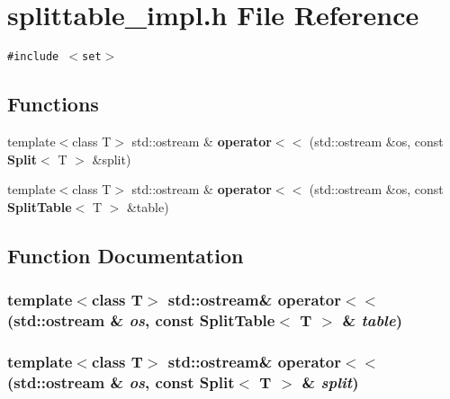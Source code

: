 \section{splittable\_\-impl.h File Reference}
\label{splittable__impl_8h}
{\tt \#include $<$set$>$}\par
\subsection*{Functions}
\begin{CompactItemize}
\item 
template$<$class T$>$ std::ostream \& {\bf operator$<$$<$} (std::ostream \&os, const {\bf Split}$<$ T $>$ \&split)
\item 
template$<$class T$>$ std::ostream \& {\bf operator$<$$<$} (std::ostream \&os, const {\bf Split\-Table}$<$ T $>$ \&table)
\end{CompactItemize}


\subsection{Function Documentation}
\subsubsection{\setlength{\rightskip}{0pt plus 5cm}template$<$class T$>$ std::ostream\& operator$<$$<$ (std::ostream \& {\em os}, const {\bf Split\-Table}$<$ T $>$ \& {\em table})}\label{splittable__impl_8h_a1}


\subsubsection{\setlength{\rightskip}{0pt plus 5cm}template$<$class T$>$ std::ostream\& operator$<$$<$ (std::ostream \& {\em os}, const {\bf Split}$<$ T $>$ \& {\em split})}\label{splittable__impl_8h_a0}


